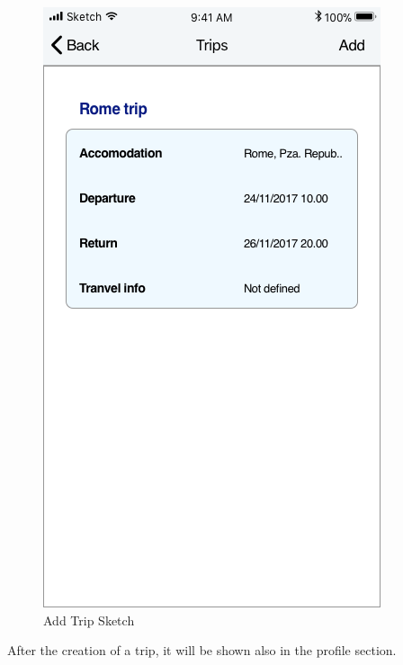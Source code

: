 \begin{figure}[H]
	\hspace{0.5cm}
	\includegraphics[scale=0.23]{Images/Interface/Trips/4_trips_list}
	\caption{Add Trip Sketch}
\end{figure}
After the creation of a trip, it will be shown also in the profile section.
